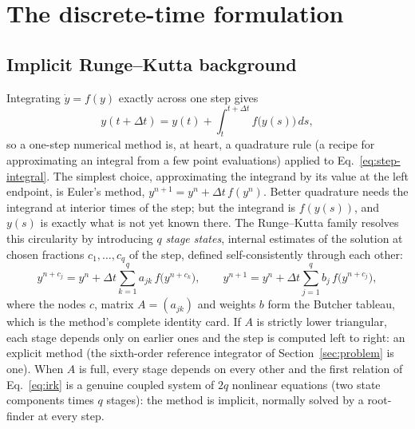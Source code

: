 \documentclass[11pt,a4paper]{article}
\begin{document}
\section{The discrete-time formulation}
\label{sec:disc-method}

\subsection{Implicit Runge--Kutta background}

Integrating $\dot y = f(y)$ exactly across one step gives
\begin{equation}
  y(t + \Delta t) = y(t) + \int_t^{t+\Delta t} f\big(y(s)\big)\, ds ,
  \label{eq:step-integral}
\end{equation}
so a one-step numerical method is, at heart, a quadrature rule (a recipe
for approximating an integral from a few point evaluations) applied to
Eq.~\eqref{eq:step-integral}. The simplest choice, approximating the
integrand by its value at the left endpoint, is Euler's method,
$y^{n+1} = y^n + \Delta t\, f(y^n)$. Better quadrature needs the
integrand at interior times of the step; but the integrand is
$f(y(s))$, and $y(s)$ is exactly what is not yet known there. The
Runge--Kutta family resolves this circularity by introducing $q$
\emph{stage states}, internal estimates of the solution at chosen
fractions $c_1, \dots, c_q$ of the step, defined self-consistently
through each other:
\begin{equation}
  y^{n+c_j} = y^n + \Delta t \sum_{k=1}^{q} a_{jk}\, f\big(y^{n+c_k}\big),
  \qquad
  y^{n+1} = y^n + \Delta t \sum_{j=1}^{q} b_j\, f\big(y^{n+c_j}\big),
  \label{eq:irk}
\end{equation}
where the nodes $c$, matrix $A = (a_{jk})$ and weights $b$ form the Butcher
tableau, which is the method's complete identity card. If $A$ is strictly
lower triangular, each stage depends only on earlier ones and the step is
computed left to right: an explicit method (the sixth-order reference
integrator of Section~\ref{sec:problem} is one). When $A$ is full, every
stage depends on every other and the first relation of
Eq.~\eqref{eq:irk} is a genuine coupled system of $2q$ nonlinear
equations (two state components times $q$ stages): the method is
implicit, normally solved by a root-finder at every step.
\end{document}
